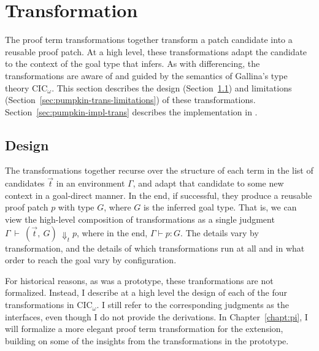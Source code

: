 \section{Transformation}
\label{sec:pumpkin-trans}

The proof term transformations together transform a patch candidate into a reusable proof patch.
At a high level, these transformations adapt the candidate to the context of the goal type that \sysname infers.
As with differencing, the transformations are aware of and guided by the semantics of Gallina's type theory CIC$_{\omega}$.
This section describes the design (Section~\ref{sec:pumpkin-trans-design}) and limitations (Section~\ref{sec:pumpkin-trans-limitations}) of these transformations.
Section~\ref{sec:pumpkin-impl-trans} describes the implementation in \sysname.


\subsection{Design}
\label{sec:pumpkin-trans-design}

The transformations together recurse over the structure of each term in the list of candidates $\vec{t}$ in an environment $\Gamma$,
and adapt that candidate to some new context in a goal-direct manner.
In the end, if successful, they produce a reusable proof patch $p$ with type $G$, where $G$ is the inferred goal type.
That is, we can view the high-level composition of transformations as a single judgment
$\Gamma\ \vdash\ (\vec{t},\ G)\ \Downarrow_{t} p$, where in the end, $\Gamma \vdash p : G$. 
The details vary by transformation,
and the details of which transformations run at all and in what order to reach the goal vary by configuration.

For historical reasons, as \sysname was a prototype, these tranformations are not formalized. %
Instead, I describe at a high level the design of each of the four transformations in CIC${_\omega}$.
I still refer to the corresponding judgments as the interfaces, even though I do not provide the derivations.
In Chapter~\ref{chapt:pi}, I will formalize a more elegant proof term transformation for the \toolnamec extension,
building on some of the insights from the transformations in the \sysname prototype.


